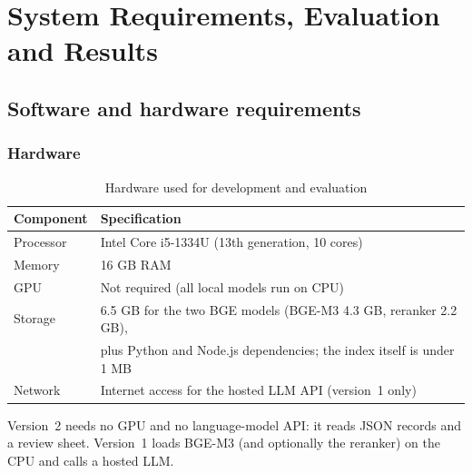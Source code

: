 \chapter{System Requirements, Evaluation and Results}
\label{ch:results}

\section{Software and hardware requirements}

\subsection{Hardware}
\begin{table}[h]
\centering
\caption{Hardware used for development and evaluation}
\begin{tabular}{ll}
\toprule
Component & Specification\\
\midrule
Processor & Intel Core i5-1334U (13th generation, 10 cores)\\
Memory & 16 GB RAM\\
GPU & Not required (all local models run on CPU)\\
Storage & 6.5 GB for the two BGE models (BGE-M3 4.3 GB, reranker 2.2 GB),\\
 & plus Python and Node.js dependencies; the index itself is under 1 MB\\
Network & Internet access for the hosted LLM API (version~1 only)\\
\bottomrule
\end{tabular}
\end{table}

Version~2 needs no GPU and no language-model API: it reads JSON records and a review sheet.
Version~1 loads BGE-M3 (and optionally the reranker) on the CPU and calls a hosted LLM.

